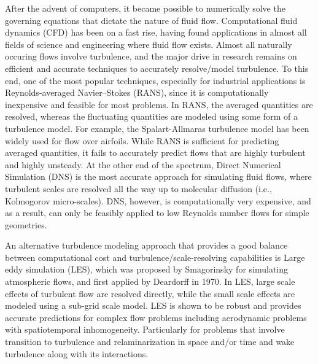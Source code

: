 After the advent of computers, it became possible to numerically solve the governing equations that dictate the nature of fluid flow.
Computational fluid dynamics (CFD) has been on a fast rise, having found applications in almost all fields of science and engineering where fluid flow exists.
Almost all naturally occuring flows involve turbulence, and the major drive in research remains on efficient and accurate techniques to accurately resolve/model turbulence.
To this end, one of the most popular techniques, especially for industrial applications is Reynolds-averaged Navier–Stokes (RANS), since it is computationally inexpensive and feasible for most problems.
In RANS, the averaged quantities are resolved, whereas the fluctuating quantities are modeled using some form of a turbulence model. For example, the Spalart-Allmaras turbulence model \cite{bib:Spalart} has been widely used for flow over airfoils.
While RANS is sufficient for predicting averaged quantities, it fails to accurately predict flows that are highly turbulent and highly unsteady.
At the other end of the spectrum, Direct Numerical Simulation (DNS) is the most accurate approach for simulating fluid flows, where turbulent scales are resolved all the way up to molecular diffusion (i.e., Kolmogorov micro-scales).
DNS, however, is computationally very expensive, and as a result, can only be feasibly applied to low Reynolds number flows for simple geometries.

An alternative turbulence modeling approach that provides a good balance between computational cost and turbulence/scale-resolving capabilities is Large eddy simulation (LES), which was proposed by Smagorinsky \cite{bib:smag} for simulating atmospheric flows, and first applied by Deardorff \cite{bib:deardorff1970} in 1970.
In LES, large scale effects of turbulent flow are resolved directly, while the small scale effects are modeled using a sub-grid scale model.
LES is shown to be robust and provides accurate predictions for complex flow problems including aerodynamic problems with spatiotemporal inhomogeneity. Particularly for problems that involve transition to turbulence and relaminarization in space and/or time and wake turbulence along with its interactions.


